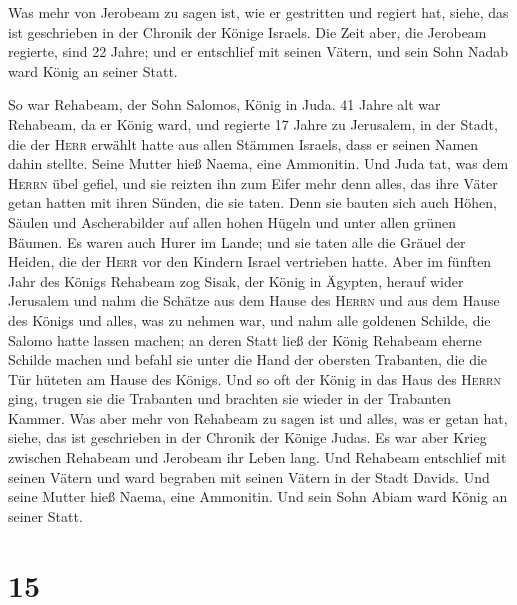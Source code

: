  Was mehr von Jerobeam zu sagen ist, wie er gestritten
und regiert hat, siehe, das ist geschrieben in der Chronik der Könige
Israels.  Die Zeit aber, die Jerobeam regierte, sind 22
Jahre; und er entschlief mit seinen Vätern, und sein Sohn Nadab ward
König an seiner Statt.

 So war Rehabeam, der Sohn Salomos, König in Juda. 41
Jahre alt war Rehabeam, da er König ward, und regierte 17 Jahre zu
Jerusalem, in der Stadt, die der \textsc{Herr} erwählt hatte aus allen
Stämmen Israels, dass er seinen Namen dahin stellte. Seine Mutter hieß
Naema, eine Ammonitin.  Und Juda tat, was dem
\textsc{Herrn} übel gefiel, und sie reizten ihn zum Eifer mehr denn
alles, das ihre Väter getan hatten mit ihren Sünden, die sie taten.
 Denn sie bauten sich auch Höhen, Säulen und
Ascherabilder auf allen hohen Hügeln und unter allen grünen Bäumen.
 Es waren auch Hurer im Lande; und sie taten alle die
Gräuel der Heiden, die der \textsc{Herr} vor den Kindern Israel
vertrieben hatte.  Aber im fünften Jahr des Königs
Rehabeam zog Sisak, der König in Ägypten, herauf wider Jerusalem
 und nahm die Schätze aus dem Hause des \textsc{Herrn}
und aus dem Hause des Königs und alles, was zu nehmen war, und nahm alle
goldenen Schilde, die Salomo hatte lassen machen;  an
deren Statt ließ der König Rehabeam eherne Schilde machen und befahl sie
unter die Hand der obersten Trabanten, die die Tür hüteten am Hause des
Königs.  Und so oft der König in das Haus des
\textsc{Herrn} ging, trugen sie die Trabanten und brachten sie wieder in
der Trabanten Kammer.  Was aber mehr von Rehabeam zu
sagen ist und alles, was er getan hat, siehe, das ist geschrieben in der
Chronik der Könige Judas.  Es war aber Krieg zwischen
Rehabeam und Jerobeam ihr Leben lang.  Und Rehabeam
entschlief mit seinen Vätern und ward begraben mit seinen Vätern in der
Stadt Davids. Und seine Mutter hieß Naema, eine Ammonitin. Und sein Sohn
Abiam ward König an seiner Statt.

\hypertarget{section-14}{%
\section{15}\label{section-14}}


